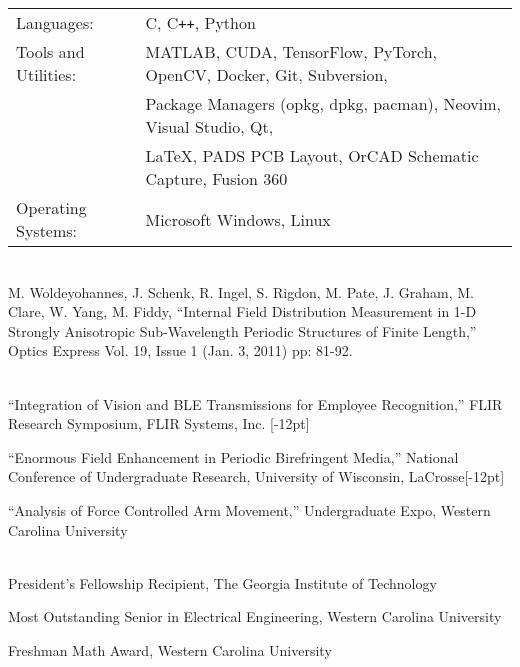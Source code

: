 \documentclass[14pt,letterpaper]{extarticle}
\begin{document}
{}

\medskip\noindent
\begin{tabularx}{\linewidth}{@{}lL@{}}
\footnotesize{Languages:} & \footnotesize{C, C\texttt{++}, Python}\vspace{0.5mm}\\
\footnotesize{Tools and Utilities:} & \footnotesize{MATLAB, CUDA, TensorFlow, PyTorch, OpenCV, Docker, Git, Subversion,}\\
                                    & \footnotesize{Package Managers (opkg, dpkg, pacman), Neovim, Visual Studio, Qt,}\\
                                    & \footnotesize{\LaTeX, PADS PCB Layout, OrCAD Schematic Capture, Fusion 360}\vspace{0.5mm}\\
\footnotesize{Operating Systems:}   & \footnotesize{Microsoft Windows, Linux}\\
\end{tabularx}

\vspace{5.3pt}\\
\noindent
\footnotesize{M. Woldeyohannes, J. Schenk, R. Ingel, S. Rigdon, M. Pate, J. Graham, M. Clare, W. Yang, M. Fiddy, ``Internal Field Distribution Measurement in 1-D Strongly Anisotropic Sub-Wavelength Periodic Structures of Finite Length,'' Optics Express Vol. 19, Issue 1 (Jan. 3, 2011) pp: 81-92.}

\vspace{5.3pt}\\
\footnotesize{``Integration of Vision and BLE Transmissions for Employee Recognition,'' FLIR Research Symposium, FLIR Systems, Inc.}
[-12pt]

\medskip\noindent
\footnotesize{``Enormous  Field  Enhancement  in  Periodic  Birefringent Media,''
National Conference of Undergraduate Research, University of Wisconsin, LaCrosse}[-12pt]

\medskip\noindent
\footnotesize{``Analysis of Force Controlled Arm Movement,'' Undergraduate Expo, Western Carolina University}

\vspace{5.3pt}\\
\noindent\footnotesize{President's Fellowship Recipient, The Georgia Institute of Technology}

\medskip
\noindent\footnotesize{Most Outstanding Senior in Electrical Engineering, Western Carolina University}

\medskip
\noindent\footnotesize{Freshman Math Award, Western Carolina University}
\end{document}
